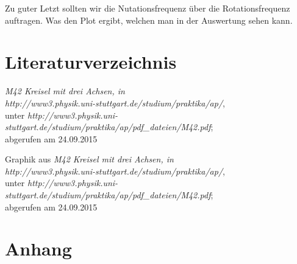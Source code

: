 \documentclass[fontsize=12pt]{scrartcl}
\begin{document}
 Zu guter Letzt sollten wir die Nutationsfrequenz über die Rotationsfrequenz auftragen. Was den Plot ergibt, welchen man in der Auswertung sehen kann. 

\newpage
\section{Literaturverzeichnis}

\renewcommand{\refname}{~}
\vspace{-30pt}
\begin{thebibliography}{xx}

     	\textit{\glqq M42 Kreisel mit drei Achsen\grqq , in 	\\
   					http://www3.physik.uni-stuttgart.de/studium/praktika/ap/}, \\
   					unter \textit{http://www3.physik.uni-stuttgart.de/studium/praktika/ap/pdf\_dateien/M42.pdf}; \\
   								abgerufen am  24.09.2015

     	Graphik aus \textit{\glqq M42 Kreisel mit drei Achsen\grqq , in 	\\
   					http://www3.physik.uni-stuttgart.de/studium/praktika/ap/}, \\
   					unter \textit{http://www3.physik.uni-stuttgart.de/studium/praktika/ap/pdf\_dateien/M42.pdf}; \\
   								abgerufen am  24.09.2015
\end{thebibliography}

\section{Anhang}
\end{document}
